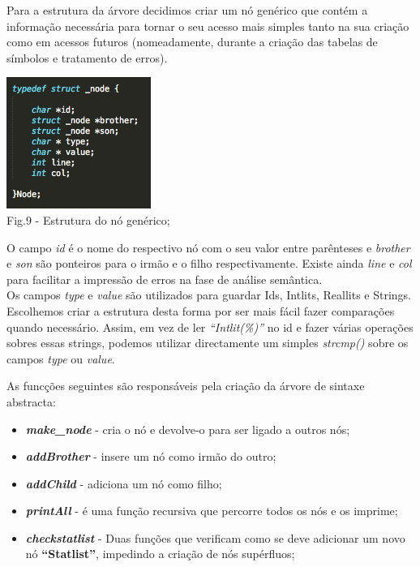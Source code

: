 \documentclass[12pt]{article}
\begin{document}
\indent Para a estrutura da árvore decidimos criar um nó genérico que contém a informação necessária para tornar o seu acesso mais simples tanto na sua criação como em acessos futuros (nomeadamente, durante a criação das tabelas de símbolos e tratamento de erros).\\

\begin{center}
\includegraphics[scale=0.9]{node_struct.png}\\
Fig.9 - Estrutura do nó genérico;
\end{center}

\indent O campo \textit{id} é o nome do respectivo nó com o seu valor entre parênteses e \textit{brother} e \textit{son} são ponteiros para o irmão e o filho respectivamente. Existe ainda \textit{line} e \textit{col} para facilitar a impressão de erros na fase de análise semântica.\\
\indent Os campos \textit{type} e \textit{value} são utilizados para guardar Id\textquotesingle s, Intlit\textquotesingle s, Reallit\textquotesingle s e String\textquotesingle s.\\
\indent Escolhemos criar a estrutura desta forma por ser mais fácil fazer comparações quando necessário. Assim, em vez de ler \textit{``Intlit(\%)''} no id e fazer várias operações sobres essas strings, podemos utilizar directamente um simples \textit{strcmp()} sobre os campos \textit{type} ou \textit{value}.

\newpage

\indent As funcções seguintes são responsáveis pela criação da árvore de sintaxe abstracta:

\begin{itemize} 

\item \textbf{\textit{make\_node}} - cria o nó e devolve-o para ser ligado a outros nós;

\item \textbf{\textit{addBrother}} - insere um nó como irmão do outro;

\item \textbf{\textit{addChild}} - adiciona um nó como filho;

\item \textbf{\textit{printAll}} - é uma função recursiva que percorre todos os nós e os imprime;

\item \textbf{\textit{checkstatlist}} - Duas funções que verificam como se deve adicionar um novo nó \textbf{``Statlist''}, impedindo a criação de nós supérfluos;

\end{itemize} 
\end{document}

